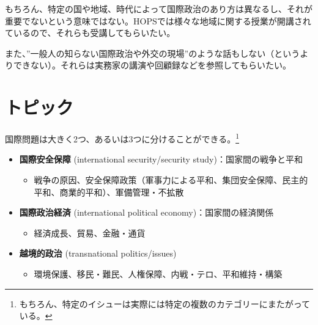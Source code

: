 \documentclass[
  xelatex,
  ja=standard]{bxjsarticle}
\providecommand{\tightlist}{%
  \setlength{\itemsep}{0pt}\setlength{\parskip}{0pt}}\usepackage{longtable,booktabs,array}
\begin{document}
\begin{tcolorbox}[enhanced jigsaw, coltitle=black, opacitybacktitle=0.6, breakable, title=\textcolor{quarto-callout-warning-color}{\faExclamationTriangle}\hspace{0.5em}{地域研究や歴史研究}, colbacktitle=quarto-callout-warning-color!10!white, toptitle=1mm, arc=.35mm, opacityback=0, toprule=.15mm, bottomtitle=1mm, left=2mm, rightrule=.15mm, leftrule=.75mm, bottomrule=.15mm, titlerule=0mm, colframe=quarto-callout-warning-color-frame, colback=white]

もちろん、特定の国や地域、時代によって国際政治のあり方は異なるし、それが重要でないという意味ではない。HOPSでは様々な地域に関する授業が開講されているので、それらも受講してもらいたい。

また、''一般人の知らない国際政治や外交の現場''のような話もしない（というよりできない）。それらは実務家の講演や回顧録などを参照してもらいたい。

\end{tcolorbox}

\hypertarget{ux30c8ux30d4ux30c3ux30af}{%
\section{トピック}\label{ux30c8ux30d4ux30c3ux30af}}

国際問題は大きく2つ、あるいは3つに分けることができる。\footnote{もちろん、特定のイシューは実際には特定の複数のカテゴリーにまたがっている。}

\begin{itemize}
\tightlist
\item
  \textbf{国際安全保障} (international security/security
  study)：国家間の戦争と平和

  \begin{itemize}
  \tightlist
  \item
    戦争の原因、安全保障政策（軍事力による平和、集団安全保障、民主的平和、商業的平和）、軍備管理・不拡散
  \end{itemize}
\item
  \textbf{国際政治経済} (international political
  economy)：国家間の経済関係

  \begin{itemize}
  \tightlist
  \item
    経済成長、貿易、金融・通貨
  \end{itemize}
\item
  \textbf{越境的政治} (transnational politics/issues)

  \begin{itemize}
  \tightlist
  \item
    環境保護、移民・難民、人権保障、内戦・テロ、平和維持・構築
  \end{itemize}
\end{itemize}
\end{document}
